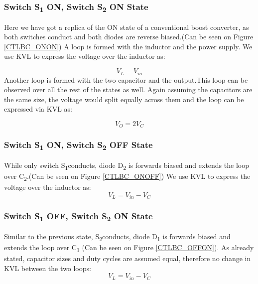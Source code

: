 \subsubsection{Switch S\textsubscript{1} ON, Switch S\textsubscript{2} ON State}
Here we have got a replica of the ON state of a conventional boost converter, as both switches conduct and both diodes are reverse biased.(Can be seen on Figure \ref{CTLBC_ONON}) A loop is formed with the inductor and the power supply. We use KVL to express the voltage over the inductor as: 

\begin{equation}
	V_{L}=V_{in}
	\label{eq:CTLBC_KVL_ONON}
\end{equation}
Another loop is formed with the two capacitor and the output.This loop can be observed over all the rest of the states as well. Again assuming the capacitors are the same size, the voltage would split equally across them and the loop can be expressed via KVL as: 

\begin{equation}
	V_O=2V_C
	\label{eq:CTLBC_KVL_ONON2}
\end{equation}


\subsubsection{Switch S\textsubscript{1} ON, Switch S\textsubscript{2} OFF State}
While only switch S\textsubscript{1}conducts, diode D\textsubscript{2} is forwards biased and extends the loop over C\textsubscript{2}.(Can be seen on Figure \ref{CTLBC_ONOFF}) We use KVL to express the voltage over the inductor as: 
\begin{equation}
	V_{L}=V_{in}-V_C
	\label{eq:CTLBC_KVL_ONOFF}
\end{equation}
 
\subsubsection{Switch S\textsubscript{1} OFF, Switch S\textsubscript{2} ON State}
Similar to the previous state, S\textsubscript{2}conducts, diode D\textsubscript{1} is forwards biased and extends the loop over C\textsubscript{1} (Can be seen on Figure \ref{CTLBC_OFFON}). As already stated, capacitor sizes and duty cycles are assumed equal, therefore no change in KVL between the two loops: 
\begin{equation}
	V_{L}=V_{in}-V_C
	\label{eq:CTLBC_KVL_OFFON}
\end{equation}

